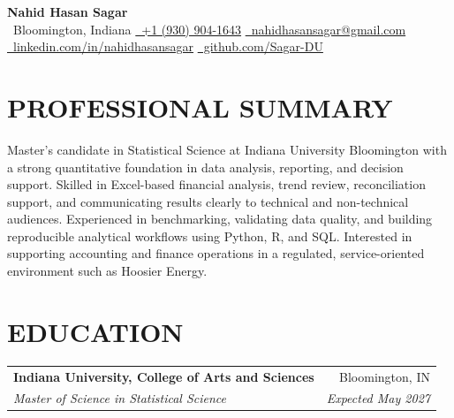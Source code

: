 \documentclass[10pt,letterpaper]{article}
\makeatletter
\newcommand{\resumeEntry}[4]{%
  \begin{tabularx}{\textwidth}{@{}Xr@{}}
    \textbf{#1} & #2 \\
    \textit{#3} & \textit{#4}
  \end{tabularx}%
}
\newcommand{\contactsep}{\qquad}
\makeatother
\begin{document}
\normalsize

\begin{center}
  {\LARGE
   \textbf{Nahid Hasan Sagar}}\\[2.2pt]

  {\footnotesize
    \faMapMarker*\, Bloomington, Indiana
    \contactsep
    \href{tel:+19309041643}{\faPhone*\, +1 (930) 904-1643}
    \contactsep
    \href{mailto:nahidhasansagar@gmail.com}{\faEnvelope\, nahidhasansagar@gmail.com}
  }\\[-0.2pt]

  {\footnotesize
    \href{https://www.linkedin.com/in/nahidhasansagar/}{\faLinkedinIn\, linkedin.com/in/nahidhasansagar}
    \contactsep
    \href{https://github.com/Sagar-DU}{\faGithub\, github.com/Sagar-DU}
  }
\end{center}

\vspace{-5pt}

\section*{PROFESSIONAL SUMMARY}

Master's candidate in Statistical Science at Indiana University Bloomington with a strong quantitative foundation in data analysis, reporting, and decision support. Skilled in Excel-based financial analysis, trend review, reconciliation support, and communicating results clearly to technical and non-technical audiences. Experienced in benchmarking, validating data quality, and building reproducible analytical workflows using Python, R, and SQL. Interested in supporting accounting and finance operations in a regulated, service-oriented environment such as Hoosier Energy.

\section*{EDUCATION}

\resumeEntry
  {Indiana University, College of Arts and Sciences}
  {Bloomington, IN}
  {Master of Science in Statistical Science}
  {Expected May 2027}
\end{document}
